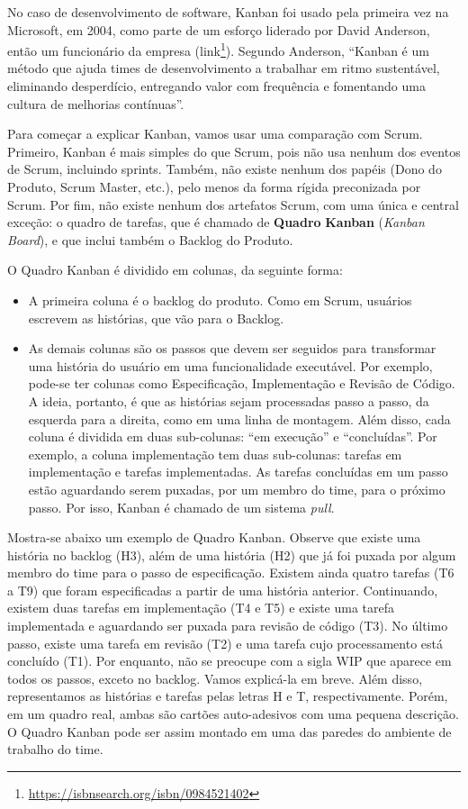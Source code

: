 \documentclass[
  11pt,
  twoside]{book}
\DeclareRobustCommand{\href}[2]{#2\footnote{\url{#1}}}
\begin{document}
 No caso de desenvolvimento de software, Kanban foi
usado pela primeira vez na Microsoft, em 2004, como parte de um esforço
liderado por David Anderson, então um funcionário da empresa
(\href{https://isbnsearch.org/isbn/0984521402}{link}). Segundo Anderson,
``Kanban é um método que ajuda times de desenvolvimento a trabalhar em
ritmo sustentável, eliminando desperdício, entregando valor com
frequência e fomentando uma cultura de melhorias contínuas''.

Para começar a explicar Kanban, vamos usar uma comparação com Scrum.
Primeiro, Kanban é mais simples do que Scrum, pois não usa nenhum dos
eventos de Scrum, incluindo sprints. Também, não existe nenhum dos
papéis (Dono do Produto, Scrum Master, etc.), pelo menos da forma rígida
preconizada por Scrum. Por fim, não existe nenhum dos artefatos Scrum,
com uma única e central exceção: o quadro de tarefas, que é chamado de
\textbf{Quadro} \textbf{Kanban} (\emph{Kanban Board}), e que inclui
também o Backlog do Produto.

O Quadro Kanban é dividido em colunas, da seguinte forma:

\begin{itemize}
\item
  A primeira coluna é o backlog do produto. Como em Scrum, usuários
  escrevem as histórias, que vão para o Backlog.
\item
  As demais colunas são os passos que devem ser seguidos para
  transformar uma história do usuário em uma funcionalidade executável.
  Por exemplo, pode-se ter colunas como Especificação, Implementação e
  Revisão de Código. A ideia, portanto, é que as histórias sejam
  processadas passo a passo, da esquerda para a direita, como em uma
  linha de montagem. Além disso, cada coluna é dividida em duas
  sub-colunas: ``em execução'' e ``concluídas''. Por exemplo, a coluna
  implementação tem duas sub-colunas: tarefas em implementação e tarefas
  implementadas. As tarefas concluídas em um passo estão aguardando
  serem puxadas, por um membro do time, para o próximo passo. Por isso,
  Kanban é chamado de um sistema \emph{pull}.
\end{itemize}

Mostra-se abaixo um exemplo de Quadro Kanban. Observe que existe uma
história no backlog (H3), além de uma história (H2) que já foi puxada
por algum membro do time para o passo de especificação. Existem ainda
quatro tarefas (T6 a T9) que foram especificadas a partir de uma
história anterior. Continuando, existem duas tarefas em implementação
(T4 e T5) e existe uma tarefa implementada e aguardando ser puxada para
revisão de código (T3). No último passo, existe uma tarefa em revisão
(T2) e uma tarefa cujo processamento está concluído (T1). Por enquanto,
não se preocupe com a sigla WIP que aparece em todos os passos, exceto
no backlog. Vamos explicá-la em breve. Além disso, representamos as
histórias e tarefas pelas letras H e T, respectivamente. Porém, em um
quadro real, ambas são cartões auto-adesivos com uma pequena descrição.
O Quadro Kanban pode ser assim montado em uma das paredes do ambiente de
trabalho do time.
\end{document}
